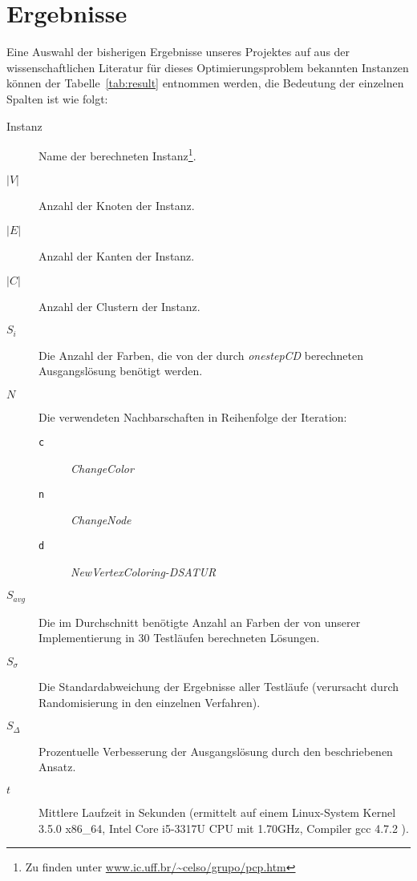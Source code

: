 \appendix

\chapter{Ergebnisse}

Eine Auswahl der bisherigen Ergebnisse unseres Projektes auf aus der wissenschaftlichen Li\-te\-ra\-tur für dieses Optimierungsproblem bekannten Instanzen können der Tabelle~\ref{tab:result} entnommen werden, die Bedeutung der einzelnen Spalten ist wie folgt:

\begin{description}
    \item[Instanz] Name der berechneten Instanz\footnote{Zu finden unter \url{www.ic.uff.br/~celso/grupo/pcp.htm}}.%
    \item[$|V|$] Anzahl der Knoten der Instanz.
    \item[$|E|$] Anzahl der Kanten der Instanz.
    \item[$|C|$] Anzahl der Clustern der Instanz.
    \item[$S_i$] Die Anzahl der Farben, die von der durch \emph{onestepCD} berechneten Ausgangslösung benötigt werden.
    \item[$N$] Die verwendeten Nachbarschaften in Reihenfolge der Iteration:
        \begin{description}
            \item[\texttt{c}] \emph{ChangeColor}
            \item[\texttt{n}] \emph{ChangeNode}
            \item[\texttt{d}] \emph{NewVertexColoring-DSATUR}
        \end{description}
    \item[$S_{avg}$] Die im Durchschnitt benötigte Anzahl an Farben der von unserer Implementierung in 30 Testläufen berechneten Lösungen.
    \item[$S_{\sigma}$] Die Standardabweichung der Ergebnisse aller Testläufe (verursacht durch Ran\-dom\-isier\-ung in den einzelnen Verfahren).
    \item[$S_{\Delta}$] Prozentuelle Verbesserung der Ausgangslösung durch den beschriebenen Ansatz.
    \item[$t$] Mittlere Laufzeit in Sekunden (ermittelt auf einem Linux-System Kernel 3.5.0 x86\_64, Intel Core i5-3317U CPU mit 1.70GHz, Compiler gcc 4.7.2 ).
\end{description}

